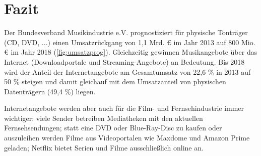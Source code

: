 \section{Fazit}
\label{sec:schluss}

Der Bundesverband Musikindustrie e.V. prognostiziert für physische Tonträger
(CD, DVD, ...) einen Umsatzrückgang von 1,1 Mrd. \euro{} im Jahr
2013 auf 800 Mio. \euro{} im Jahr 2018 (\autoref{fig:umsatzprog}). Gleichzeitig
gewinnen Musikangebote über das Internet (Downloadportale und
Streaming-Angebote) an Bedeutung. Bis 2018 wird der Anteil der Internetangebote
am Gesamtumsatz von 22,6 \% in 2013 auf 50 \% steigen und damit gleichauf mit
dem Umsatzanteil von physischen Datenträgern (49,4 \%) liegen.


Internetangebote werden aber auch für die Film- und Fernsehindustrie immer
wichtiger: viele Sender betreiben Mediatheken mit den aktuellen
Fernsehsendungen; statt eine DVD oder Blue-Ray-Disc zu kaufen oder auszuleihen
werden Filme aus Videoportalen wie Maxdome und Amazon Prime geladen; Netflix
bietet Serien und Filme ausschließlich online an.

